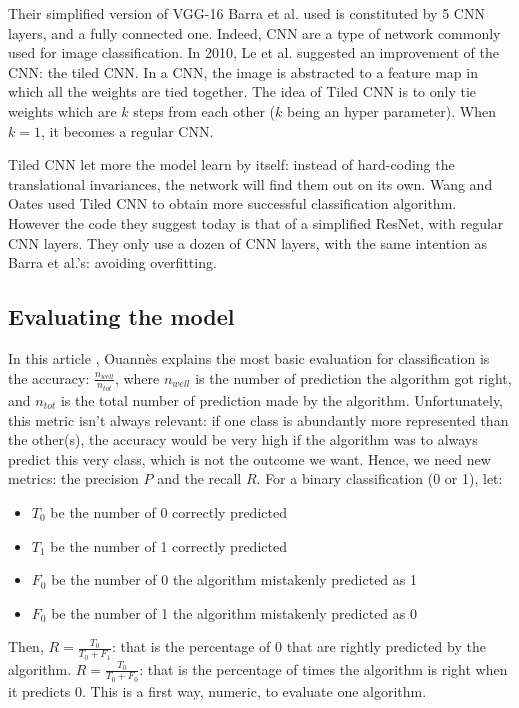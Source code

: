 \documentclass[11pt]{article}
\begin{document}
\begin{onehalfspace}
Their simplified version of VGG-16 Barra et al. used is constituted by 5 CNN layers, and a fully connected one. Indeed, CNN are a type of network commonly used for image classification. In 2010, Le et al. \cite{le} suggested an improvement of the CNN: the tiled CNN. In a CNN, the image is abstracted to a feature map in which all the weights are tied together. The idea of Tiled CNN is to only tie weights which are $k$ steps from each other ($k$ being an hyper parameter). When $k = 1$, it becomes a regular CNN. 

Tiled CNN let more the model learn by itself: instead of hard-coding the translational invariances, the network will find them out on its own. Wang and Oates \cite{wang} used Tiled CNN to obtain more successful classification algorithm. However the code they suggest today is that of a simplified ResNet, with regular CNN layers. They only use a dozen of CNN layers, with the same intention as Barra et al.'s: avoiding overfitting. 

\subsection{Evaluating the model}
\label{eval}

In this article \cite{ouannes}, Ouannès explains the most basic evaluation for classification is the accuracy: $\frac{n_{well}}{n_{tot}}$, where $n_{well}$ is the number of prediction the algorithm got right, and $n_{tot}$ is the total number of prediction made by the algorithm. Unfortunately, this metric isn't always relevant: if one class is abundantly more represented than the other(s), the accuracy would be very high if the algorithm was to always predict this very class, which is not the outcome we want. Hence, we need new metrics: the precision $P$ and the recall $R$. For a binary classification (0 or 1), let:

\begin{itemize}
    \item $T_0$ be the number of 0 correctly predicted
    \item $T_1$ be the number of 1 correctly predicted
    \item $F_0$ be the number of 0 the algorithm mistakenly predicted as 1
    \item $F_0$ be the number of 1 the algorithm mistakenly predicted as 0
\end{itemize}

Then, $R = \frac{T_0}{T_0 + F_1}$: that is the percentage of 0 that are rightly predicted by the algorithm. $R = \frac{T_0}{T_0 + F_0}$: that is the percentage of times the algorithm is right when it predicts 0. This is a first way, numeric, to evaluate one algorithm.


\end{onehalfspace}
\end{document}
